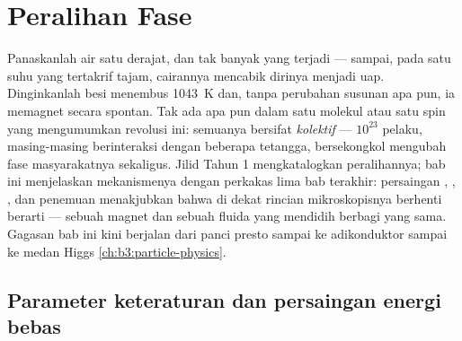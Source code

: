 \chapter{Peralihan Fase}\label{ch:b3:phase-transitions}

Panaskanlah air satu derajat, dan tak banyak yang terjadi --- sampai,
pada satu suhu yang tertakrif tajam, cairannya mencabik dirinya menjadi
uap. Dinginkanlah besi menembus \qty{1043}{K} dan, tanpa perubahan
susunan apa pun, ia memagnet secara spontan. Tak ada apa pun dalam satu
molekul atau satu spin yang mengumumkan revolusi ini: semuanya bersifat
\emph{kolektif} --- $10^{23}$ pelaku, masing-masing berinteraksi dengan
beberapa tetangga, bersekongkol mengubah fase masyarakatnya sekaligus.
Jilid Tahun 1 mengkatalogkan peralihannya; bab ini menjelaskan
mekanismenya dengan perkakas lima bab terakhir: persaingan ,
, , dan penemuan menakjubkan
bahwa di dekat  rincian mikroskopisnya berhenti berarti ---
sebuah magnet dan sebuah fluida yang mendidih berbagi 
yang sama. Gagasan bab ini kini berjalan dari panci presto sampai ke
adikonduktor sampai ke medan Higgs
\cref{ch:b3:particle-physics}.

\section{Parameter keteraturan dan persaingan energi bebas}

